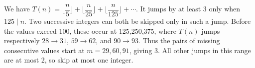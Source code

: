 We have $T(n)=\lfloor\dfrac{n}{5}\rfloor+\lfloor\dfrac{n}{25}\rfloor+\lfloor\dfrac{n}{125}\rfloor+\cdots$. It jumps by at least 3 only when $125\mid n$. Two successive integers can both be skipped only in such a jump. Before the values exceed 100, these occur at 125,250,375, where $T(n)$ jumps respectively $28\to31$, $59\to62$, and $90\to93$. Thus the pairs of missing consecutive values start at $m=29,60,91$, giving $\boxed3$. All other jumps in this range are at most 2, so skip at most one integer.
